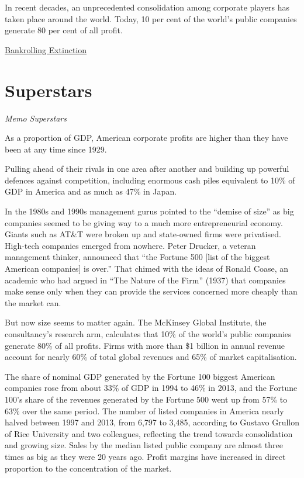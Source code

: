 \documentclass[
]{book}
\begin{document}
In recent decades, an unprecedented
consolidation among corporate players has
taken place around the world. Today, 10 per
cent of the world's public companies generate
80 per cent of all profit.

\href{https://portfolio.earth/campaigns/bankrolling-extinction/}{Bankrolling Extinction}

\hypertarget{superstars}{%
\section{Superstars}\label{superstars}}

\emph{Memo Superstars}

As a proportion of GDP, American corporate profits are higher
than they have been at any time since 1929.

Pulling ahead of their rivals in one area after another and building up powerful defences against competition, including enormous cash piles equivalent to 10\% of GDP in America and as much as 47\% in Japan.

In the 1980s and 1990s management gurus pointed to the ``demise of size'' as big companies seemed to be giving way to a much more entrepreneurial economy.
Giants such as AT\&T were broken up and state-owned firms were privatised. High-tech companies emerged from nowhere. Peter Drucker, a veteran management thinker, announced that ``the Fortune 500 {[}list of the biggest American companies{]} is over.'' That chimed with the ideas of Ronald Coase, an academic who had argued in ``The Nature of the Firm'' (1937) that companies make sense only when they can provide the services concerned more cheaply than the market can.

But now size seems to matter again. The McKinsey Global Institute, the consultancy's research arm, calculates that 10\% of the world's public companies generate 80\% of all profits.
Firms with more than \$1 billion in annual revenue account for nearly 60\% of total global revenues and 65\% of market capitalisation.

The share of nominal GDP generated by the Fortune 100 biggest American companies rose from about 33\% of GDP in 1994 to 46\% in 2013, and the Fortune 100's share of the revenues generated by the Fortune 500 went up from 57\% to 63\% over the same period. The number of listed companies in America nearly halved between 1997 and 2013, from 6,797 to 3,485, according to Gustavo Grullon of Rice University and two colleagues, reflecting the trend towards consolidation and growing size. Sales by the median listed public company are almost three times as big as they were 20 years ago. Profit margins have increased in direct proportion to the concentration of the market.
\end{document}
